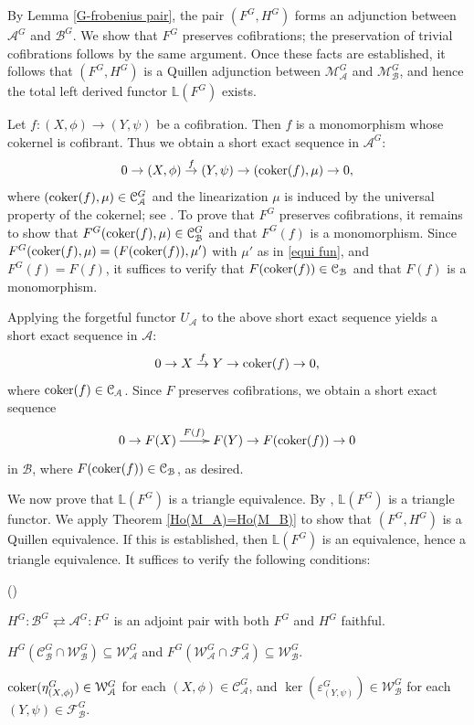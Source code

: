 \documentclass[12pt,twoside]{amsart}
\theoremstyle{bfupright head,slanted body}
\theoremstyle{bfupright head,upright body}
\theoremstyle{fixed bf head,slanted body}
\theoremstyle{fixed bf head,upright body}
\theoremstyle{numbered paragraph}
\newlength{\thmlistleft}        %
\newlength{\thmlistright}       %
\newlength{\thmlistpartopsep}   %
\newlength{\thmlisttopsep}      %
\newlength{\thmlistparsep}      %
\newlength{\thmlistitemsep}     %
\newcounter{rqm}
\newenvironment{rqm}{\begin{list}{\upshape (\arabic{rqm})}%
    {\usecounter{rqm}%
      \setlength{\leftmargin}{\thmlistleft}%
      \setlength{\labelwidth}{\thmlistleft}%
      \setlength{\rightmargin}{\thmlistright}%
      \setlength{\partopsep}{\thmlistpartopsep}%
      \setlength{\topsep}{\thmlisttopsep}%
      \setlength{\parsep}{\thmlistparsep}%
      \setlength{\itemsep}{\thmlistitemsep}}}%
  {\end{list}}%
\newenvironment{prf*}[1][Proof]{%
  \begin{proof}[\bf #1]
    \setcounter{equation}{0}
    \renewcommand{\theequation}{\arabic{equation}}}
  {\end{proof}
}
\newcommand{\thmcite}[2][?]{\cite[Theorem~#1]{#2}}
\newcommand{\rmkcite}[2][?]{\cite[Remark~#1]{#2}}
\numberwithin{equation}{res}
\newcommand{\calC}{\mathcal{C}}
\newcommand{\calW}{\mathcal{W}}
\newcommand{\calF}{\mathcal{F}}
\newcommand{\calA}{\mathcal{A}}
\newcommand{\calB}{\mathcal{B}}
\newcommand{\calM}{\mathcal{M}}
\newcommand{\cok}{\mbox{\rm coker}}
\begin{document}
\begin{prf*}
By Lemma \ref{G-frobenius pair}, the pair $(F^G, H^G)$ forms an adjunction between $\calA^G$ and $\calB^G$.
We show that $F^G$ preserves cofibrations; the preservation of trivial cofibrations follows by the same argument.
Once these facts are established, it follows that $(F^G, H^G)$ is a Quillen adjunction between $\calM_\calA^G$ and $\calM_\calB^G$, and hence the total left derived functor $\mathbb{L}(F^G)$ exists.

Let $f: (X, \phi) \to (Y, \psi)$ be a cofibration.
Then $f$ is a monomorphism whose cokernel is cofibrant.
Thus we obtain a short exact sequence in $\calA^G$:
\[
0 \to (X, \phi) \overset{f}{\rightarrow} (Y, \psi) \to (\cok(f), \mu) \to 0,
\]
where $(\cok(f), \mu) \in \calC_\calA^G$ and the linearization $\mu$ is induced by the universal property of the cokernel; see \rmkcite[2.6]{2025Equ}.
To prove that $F^G$ preserves cofibrations, it remains to show that $F^G(\cok(f), \mu) \in \calC_\calB^G$ and that $F^G(f)$ is a monomorphism.
Since $F^G(\cok(f), \mu) = (F(\cok(f)), \mu')$ with $\mu'$ as in \ref{equi fun}, and $F^G(f)=F(f)$, it suffices to verify that $F(\cok(f)) \in \calC_\calB$ and that $F(f)$ is a monomorphism.

Applying the forgetful functor $U_\calA$ to the above short exact sequence yields a short exact sequence in $\calA$:
\[
0 \to X \overset{f}\rightarrow Y \to \cok(f) \to 0,
\]
where $\cok(f) \in \calC_\calA$.
Since $F$ preserves cofibrations, we obtain a short exact sequence
\[
\xymatrix@C=0.8cm{
0  \to  F(X) \ar[r]^{F(f) \qquad \quad\,\,\,}  &  F(Y)  \to  F(\cok(f))  \to  0 }
\]
in $\calB$, where $F(\cok(f)) \in \calC_\calB$, as desired.


We now prove that $\mathbb{L}(F^G)$ is a triangle equivalence.
By \thmcite[7.12]{2025GillBook}, $\mathbb{L}(F^G)$ is a triangle functor.
We apply Theorem \ref{Ho(M_A)=Ho(M_B)} to show that $(F^G,H^G)$ is a Quillen equivalence.
If this is established, then $\mathbb{L}(F^G)$ is an equivalence, hence a triangle equivalence.
It suffices to verify the following conditions:
\begin{rqm}
\item
$H^G : \calB^G \rightleftarrows \calA^G : F^G$ is an adjoint pair with both $F^G$ and $H^G$ faithful.
\item
$H^G(\calC_\calB^G \cap \calW_\calB^G) \subseteq \calW_\calA^G$ and $F^G(\calW_\calA^G \cap \calF_\calA^G) \subseteq \calW_\calB^G$.
\item
$\cok(\eta^G_{(X, \phi)}) \in \calW_\calA^G$ for each $(X, \phi) \in \calC_\calA^G$, and $\ker(\varepsilon^G_{(Y, \psi)}) \in \calW_\calB^G$ for each $(Y, \psi) \in \calF_\calB^G$.
\end{rqm}


\end{prf*}
\end{document}
